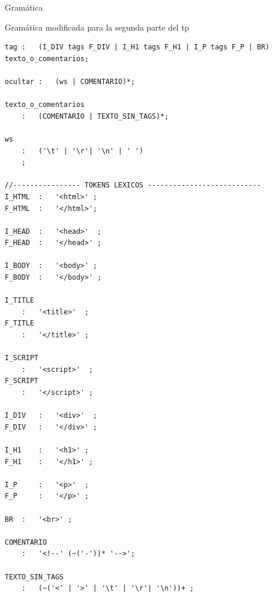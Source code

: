 \documentclass[a4paper,8pt]{article}
\begin{document}
\begin{section}{Gramática}
\begin{subsection}{Gramática modificada para la segunda parte del tp}
\begin{verbatim}
tag	:	(I_DIV tags F_DIV | I_H1 tags F_H1 | I_P tags F_P | BR) texto_o_comentarios;

ocultar	:	(ws | COMENTARIO)*;

texto_o_comentarios
	:	(COMENTARIO | TEXTO_SIN_TAGS)*;

ws 
    :   ('\t' | '\r'| '\n' | ' ')
    ;

//---------------- TOKENS LEXICOS ---------------------------
I_HTML 	:	'<html>' ;
F_HTML 	:	'</html>';

I_HEAD 	:	'<head>'  ;
F_HEAD 	:	'</head>' ;

I_BODY 	:	'<body>' ;
F_BODY 	:	'</body>' ;

I_TITLE
 	:	'<title>'  ;
F_TITLE 
	:	'</title>' ;
	
I_SCRIPT
 	:	'<script>'  ;
F_SCRIPT 
	:	'</script>' ;
	
I_DIV 	:	'<div>'  ;
F_DIV 	:	'</div>' ;
	
I_H1 	:	'<h1>' ;
F_H1 	:	'</h1>' ;
	
I_P 	:	'<p>'  ;
F_P 	:	'</p>' ;

BR 	:	'<br>' ;

COMENTARIO 
	:	'<!--' (~('-'))* '-->';

TEXTO_SIN_TAGS 
	:	(~('<' | '>' | '\t' | '\r'| '\n'))+ ;


 \end{verbatim} 



\end{subsection}
\end{section}
\newpage
\end{document}
